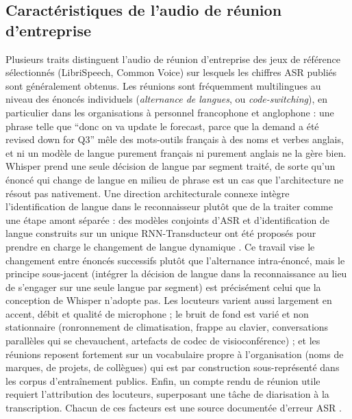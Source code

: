 \documentclass[12pt]{report}
\begin{document}
\subsection{Caractéristiques de l'audio de réunion d'entreprise}
Plusieurs traits distinguent l'audio de réunion d'entreprise des jeux de référence sélectionnés (LibriSpeech, Common Voice) sur lesquels les chiffres ASR publiés sont généralement obtenus. Les réunions sont fréquemment multilingues au niveau des énoncés individuels (\textit{alternance de langues}, ou \textit{code-switching}), en particulier dans les organisations à personnel francophone et anglophone : une phrase telle que \enquote{donc on va update le forecast, parce que la demand a été revised down for Q3} mêle des mots-outils français à des noms et verbes anglais, et ni un modèle de langue purement français ni purement anglais ne la gère bien. Whisper prend une seule décision de langue par segment traité, de sorte qu'un énoncé qui change de langue en milieu de phrase est un cas que l'architecture ne résout pas nativement. Une direction architecturale connexe intègre l'identification de langue dans le reconnaisseur plutôt que de la traiter comme une étape amont séparée : des modèles conjoints d'ASR et d'identification de langue construits sur un unique RNN-Transducteur ont été proposés pour prendre en charge le changement de langue dynamique \cite{punjabi2021joint}. Ce travail vise le changement entre énoncés successifs plutôt que l'alternance intra-énoncé, mais le principe sous-jacent (intégrer la décision de langue dans la reconnaissance au lieu de s'engager sur une seule langue par segment) est précisément celui que la conception de Whisper n'adopte pas. Les locuteurs varient aussi largement en accent, débit et qualité de microphone ; le bruit de fond est varié et non stationnaire (ronronnement de climatisation, frappe au clavier, conversations parallèles qui se chevauchent, artefacts de codec de visioconférence) ; et les réunions reposent fortement sur un vocabulaire propre à l'organisation (noms de marques, de projets, de collègues) qui est par construction sous-représenté dans les corpus d'entraînement publics. Enfin, un compte rendu de réunion utile requiert l'attribution des locuteurs, superposant une tâche de diarisation à la transcription. Chacun de ces facteurs est une source documentée d'erreur ASR \cite{farahani2017autocorrelation,yoshioka2019advances}.
\end{document}
